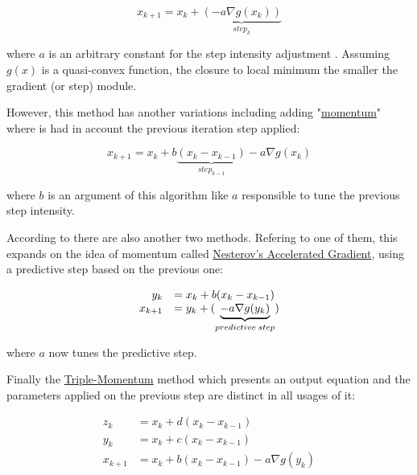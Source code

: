 \begin{equation}
    x_{k+1} = x_k + \underbrace{(- a \nabla g(x_k))}_{step_{k}}
    \label{eq:Gradient_Descent_Normal}
\end{equation}

where \(a\) is an arbitrary constant for the step intensity adjustment . Assuming \(g(x)\) is a quasi-convex function, the closure to local minimum the smaller the gradient (or step) module. \par

However, this method has another variations including adding "\underline{momentum}" where is had in account the previous iteration step applied:

\begin{equation}
    x_{k+1} = x_k + b \underbrace{(x_k - x_{k-1})}_{step_{k-1}} - a \nabla g(x_k)
    \label{eq_Gradient_Descent_Momentum}
\end{equation}

where \(b\) is an argument of this algorithm like \(a\) responsible to tune the previous step intensity. \par
According to \cite{hao2025analysis} there are also another two methods. Refering to one of them, this expands on the idea of momentum called \underline{Nesterov's Accelerated Gradient}, using a predictive step based on the previous one: 

\begin{equation}
    \begin{array}{rl}
      y_k &=  x_k + b (x_k - x_{k-1})  \\
      x_{k+1} &= y_k + (\underbrace{- a \nabla g(y_k)}_{predictive  \hspace{0.2em}step})
    \end{array}
    \label{eq_Gradient_Descent_Nesterov}
\end{equation}

where \(a\) now tunes the predictive step. \par

Finally the \underline{Triple-Momentum} method which presents an output equation and the parameters applied on the previous step are distinct in all usages of it:

\begin{equation}
    \begin{array}{rl}
      z_k &= x_k + d (x_k - x_{k-1}) \\
      y_k &=  x_k + c (x_k - x_{k-1})  \\
      x_{k+1} &= x_k + b(x_k - x_{k-1}) - a \nabla g(y_k)
    \end{array}
    \label{eq_Gradient_Descent_Nesterov}
\end{equation}

